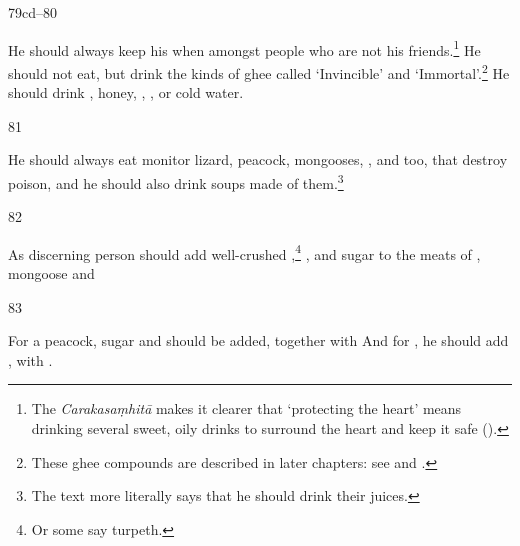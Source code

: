 \begin{translation}
\item[79cd--80]

He should always keep his  when amongst 
people
who are not his friends.\footnote{The
\emph{Carakasaṃhitā} makes it clearer that `protecting the heart' means 
drinking
several sweet, oily drinks to surround the heart and keep it safe
().} He should not eat, but drink the kinds of ghee called
 `Invincible' and
`Immortal'.\footnote{These ghee compounds are described in later chapters: see
 and .} He should drink 
,
honey, , , or cold water.

\item[81]

He should always eat monitor
    lizard, peacock, mongooses, 
,
and  too, 
that destroy poison, and he should also drink soups made of them.\footnote{The 
text more literally says that he should drink their juices.} 

\item [82]

As discerning person should add well-crushed
,\footnote{Or some say turpeth.}
,
and sugar to the meats of
,
mongoose and

\item[83]

For a peacock, sugar and
should be added, together with
And for 
,
he should add
,
with .


\end{translation}
